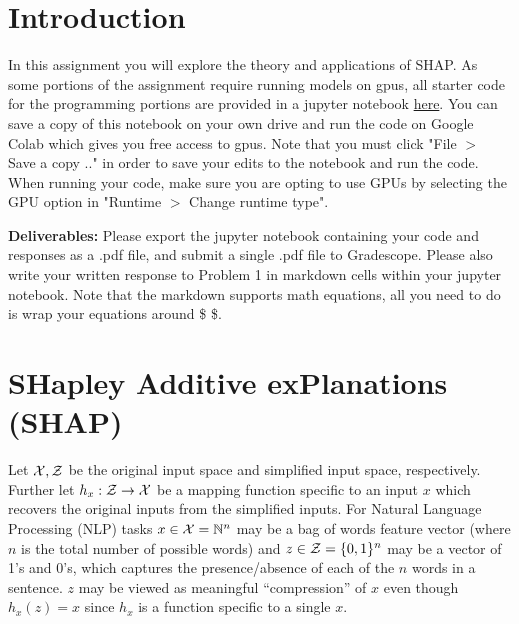\section*{Introduction}
In this assignment you will explore the theory and applications of SHAP. As some portions of the assignment require running models on gpus, all starter code for the programming portions are provided in a jupyter notebook \href{https://colab.research.google.com/drive/1KXE8oOBu-ddewEbOxBOZ5iH4CKw1lOk8?usp=sharing}{here}. You can save a copy of this notebook on your own drive and run the code on Google Colab which gives you free access to gpus. Note that you must click "File $>$ Save a copy .." in order to save your edits to the notebook and run the code. When running your code, make sure you are opting to use GPUs by selecting the GPU option in "Runtime $>$ Change runtime type". 

\textbf{Deliverables: } Please export the jupyter notebook containing your code and responses as a .pdf file, and submit a single .pdf file to Gradescope. Please also write your written response to Problem 1 in markdown cells within your jupyter notebook. Note that the markdown supports math equations, all you need to do is wrap your equations around \$ \$.

\section*{SHapley Additive exPlanations (SHAP)}
Let ${\mathcal{X}}, {\mathcal{Z}}$ be the original input space and simplified input space, respectively. Further let $h_{x}: {\mathcal{Z}} \rightarrow \mathcal{X}$ be a mapping function specific to an input $x$ which recovers the original inputs from the simplified inputs. For Natural Language Processing (NLP) tasks $x \in {\mathcal{X}} = {\mathbb{N}}^{n}$ may be a bag of words feature vector (where $n$ is the total number of possible words) and $z \in {\mathcal{Z}} = \{0, 1\}^{n}$ may be a vector of 1's and 0's, which captures the presence/absence of each of the $n$ words in a sentence. $z$ may be viewed as meaningful ``compression'' of $x$ even though $h_{x}(z) = x$ since $h_{x}$ is a function specific to a single $x$.

